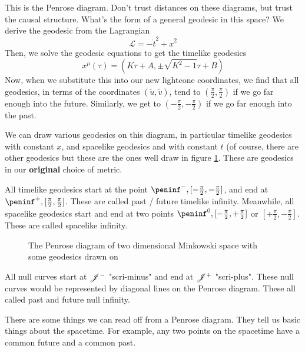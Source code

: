 This is the Penrose diagram. Don't
trust distances on these diagrams, but trust the causal structure. 
What's the form of a general geodesic in this space? 
We derive the geodesic from the Lagrangian
\[
 \mathcal{ L }  = - \dot{ t } ^ 2 + \dot{ x } ^ 2  
\] Then, we solve the geodesic equations 
to get the timelike geodesics 
\[
	x ^ \mu ( \tau ) = \left(  K \tau + A , \pm \sqrt{ K ^ 2 - 1 }  \tau  + B \right) 
\] Now, when we substitute this 
into our new lightcone coordinates, 
we find that all geodesics, in terms of the coordinates 
$ ( \tilde{ u }, \tilde{ v  } )   $, tend to $ ( \frac{\pi}{2 } , \frac{\pi}{2 } )$
if we go far enough into the future. Similarly, we get to 
$ (  - \frac{\pi}{2 } , -\frac{\pi}{ 2 } ) $ if we 
go far enough into the past.  

We can draw various geodesics on this diagram, 
in particular timelike geodesics with constant $ x $, 
and spacelike geodesics and with constant $  t$  
(of course, there are other geodesics but these are the ones well draw in
figure \ref{fig:p_2}. 
These are geodesics in our \textbf{original } choice 
of metric.

All timelike geodesics start at the point $ \peninf ^ -  , [ - \frac{\pi}{2 } , - \frac{\pi}{2  }] $, 
and end at $ \peninf ^ + , [ \frac{\pi}{2 } , \frac{\pi}{ 2   }]$. These are
called past / future timelike infinity. 
Meanwhile, all spacelike geodesics 
start and end at two points $ \peninf ^ 0  , [ - \frac{\pi}{2 }, + \frac{\pi}{2 } ] $ or 
$ [ + \frac{\pi}{2 } , - \frac{\pi}{ 2 } ] $. These are called spacelike 
infinity. 

\begin{figure}[h]
	\centering
	
	\caption{The Penrose diagram of two dimensional Minkowski 
	space with some geodesics drawn on}
	\label{fig:p_2}
\end{figure}

All null curves start at $ \mathscr{J} ^ - $ "scri-minus" and end at $ \mathscr{J} ^ + $ "scri-plus".
These null curves would be represented by diagonal lines on the Penrose diagram. 
These all called past and future null infinity.

There are some things we can read off
from a Penrose diagram. They tell us 
basic things about the spacetime.
For example, any two points on the spacetime 
have a common future and a common past. 

